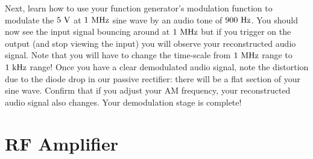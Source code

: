 \documentclass[12pt]{article}
\begin{document}
Next, learn how to use your function generator's modulation function to modulate the $5~\rm V$ at $1~\rm MHz$ sine wave by an audio tone of $900~\rm Hz$.  You should now see the input signal bouncing around at $1~\rm MHz$ but if you trigger on the output (and stop viewing the input) you will observe your reconstructed audio signal.  Note that you will have to change the time-scale from $1~\rm MHz$ range to $1~\rm kHz$ range!
Once you have a clear demodulated audio signal, note the distortion due to the diode drop in our passive rectifier:  there will be a flat section of your sine wave.  Confirm that if you adjust your AM frequency, your reconstructed audio signal also changes.  Your demodulation stage is complete!

\section{RF Amplifier}
\end{document}
